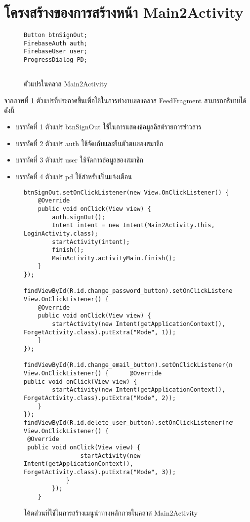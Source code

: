 	\section{โครงสร้างของการสร้างหน้า Main2Activity}
	\begin{figure}[H]
		{\begin{lstlisting}
Button btnSignOut;
FirebaseAuth auth;
FirebaseUser user;
ProgressDialog PD;
	
			\end{lstlisting}}
		\caption{ตัวแปรในคลาส Main2Activity}
		\label{Fig:Main2Activity}
	\end{figure}
	\newpage
	จากภาพที่ \ref{Fig:Main2Activity} ตัวแปรที่ประกาศขึ้นเพื่อใช้ในการทำงานของคลาส FeedFragment สามารถอธิบายได้ดังนี้
	\begin{itemize}[label={--}]
		\item บรรทัดที่ 1 ตัวแปร btnSignOut ใช้ในการแสดงข้อมูลลิสต์รายการข่าวสาร
		\item บรรทัดที่ 2 ตัวแปร auth ใช้จัดเก็บและยืนตัวตนของสมาชิก
		\item บรรทัดที่ 3 ตัวแปร user ใช้จัดการข้อมูลของสมาชิก
		\item บรรทัดที่ 4 ตัวแปร pd ใช้สำหรับเป็นแจ้งเตือน
	\end{itemize}
	\begin{figure}[H]
		{\begin{lstlisting}
btnSignOut.setOnClickListener(new View.OnClickListener() {
    @Override
    public void onClick(View view) {
        auth.signOut();
        Intent intent = new Intent(Main2Activity.this, LoginActivity.class);
        startActivity(intent);
        finish();
        MainActivity.activityMain.finish();
    }
});

findViewById(R.id.change_password_button).setOnClickListener(new View.OnClickListener() {
    @Override
    public void onClick(View view) {
        startActivity(new Intent(getApplicationContext(), ForgetActivity.class).putExtra("Mode", 1));
    }
});

findViewById(R.id.change_email_button).setOnClickListener(new View.OnClickListener() {		@Override            		public void onClick(View view) {
        startActivity(new Intent(getApplicationContext(), ForgetActivity.class).putExtra("Mode", 2));
    }
});
findViewById(R.id.delete_user_button).setOnClickListener(new View.OnClickListener() {
 @Override            
 public void onClick(View view) {
                startActivity(new Intent(getApplicationContext(), ForgetActivity.class).putExtra("Mode", 3));
            }
        });
    }
			\end{lstlisting}}
		\caption{โค้ดส่วนที่ใช้ในการสร้างเมนูนำทางหลักภายในคลาส Main2Activity}
		\label{Fig:Main2Activity2}
	\end{figure}
